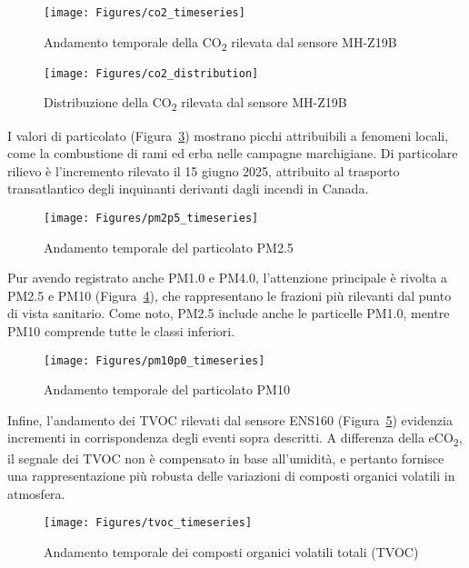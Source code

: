 \documentclass[fleqn,10pt]{SelfArx} %
\begin{document}
\begin{figure}[ht]\centering
	\texttt{[image: Figures/co2\_timeseries]}
	\caption{Andamento temporale della CO\textsubscript{2} rilevata dal sensore MH-Z19B}
	\label{fig:mhz19b_timeseries}
\end{figure}

\begin{figure}[ht]\centering
	\texttt{[image: Figures/co2\_distribution]}
	\caption{Distribuzione della CO\textsubscript{2} rilevata dal sensore MH-Z19B}
	\label{fig:mhz19b_distribution}
\end{figure}

I valori di particolato (Figura~\ref{fig:pm2p5_timeseries}) mostrano picchi attribuibili a fenomeni locali, come la combustione di rami ed erba nelle campagne marchigiane. Di particolare rilievo è l’incremento rilevato il 15 giugno 2025, attribuito al trasporto transatlantico degli inquinanti derivanti dagli incendi in Canada. 

\begin{figure}[ht]\centering
	\texttt{[image: Figures/pm2p5\_timeseries]}
	\caption{Andamento temporale del particolato PM2.5}
	\label{fig:pm2p5_timeseries}
\end{figure}


Pur avendo registrato anche PM1.0 e PM4.0, l’attenzione principale è rivolta a PM2.5 e PM10 (Figura~\ref{fig:pm10p0_timeseries}), che rappresentano le frazioni più rilevanti dal punto di vista sanitario. Come noto, PM2.5 include anche le particelle PM1.0, mentre PM10 comprende tutte le classi inferiori.

\begin{figure}[ht]\centering
	\texttt{[image: Figures/pm10p0\_timeseries]}
	\caption{Andamento temporale del particolato PM10}
	\label{fig:pm10p0_timeseries}
\end{figure}

Infine, l’andamento dei TVOC rilevati dal sensore ENS160 (Figura~\ref{fig:tvoc_timeseries}) evidenzia incrementi in corrispondenza degli eventi sopra descritti. A differenza della eCO\textsubscript{2}, il segnale dei TVOC non è compensato in base all’umidità, e pertanto fornisce una rappresentazione più robusta delle variazioni di composti organici volatili in atmosfera.

\begin{figure}[ht]\centering
	\texttt{[image: Figures/tvoc\_timeseries]}
	\caption{Andamento temporale dei composti organici volatili totali (TVOC)}
	\label{fig:tvoc_timeseries}
\end{figure}
\end{document}
